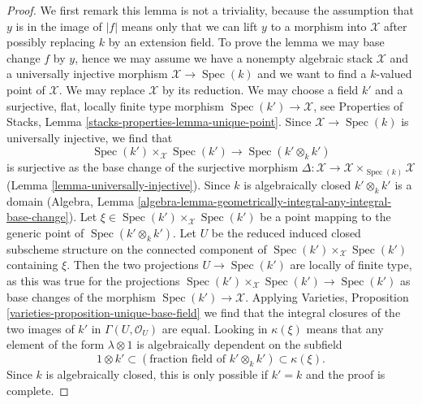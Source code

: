 \documentclass[10pt,a4paper]{amsart}
\theoremstyle{plain}
\theoremstyle{definition}
\theoremstyle{remark}
\numberwithin{equation}{subsection}
\def\Spec{\mathop{\mathrm{Spec}}}
\begin{document}
\begin{proof}
We first remark this lemma is not a triviality, because the assumption that
$y$ is in the image of $|f|$ means only that we can lift
$y$ to a morphism into $\mathcal{X}$ after possibly replacing
$k$ by an extension field. To prove the lemma we may base change
$f$ by $y$, hence we may assume we have a nonempty algebraic stack
$\mathcal{X}$ and a universally injective morphism
$\mathcal{X} \to \Spec(k)$ and we want to find a $k$-valued point
of $\mathcal{X}$. We may replace $\mathcal{X}$ by its reduction.
We may choose a field $k'$ and a surjective, flat, locally finite type morphism
$\Spec(k') \to \mathcal{X}$, see
Properties of Stacks, Lemma \ref{stacks-properties-lemma-unique-point}.
Since $\mathcal{X} \to \Spec(k)$ is universally injective, we find that
$$
\Spec(k') \times_\mathcal{X} \Spec(k') \to \Spec(k' \otimes_k k')
$$
is surjective as the base change of the surjective morphism
$\Delta : \mathcal{X} \to \mathcal{X} \times_{\Spec(k)} \mathcal{X}$
(Lemma \ref{lemma-universally-injective}).
Since $k$ is algebraically closed $k' \otimes_k k'$ is a domain
(Algebra, Lemma
\ref{algebra-lemma-geometrically-integral-any-integral-base-change}).
Let $\xi \in \Spec(k') \times_\mathcal{X} \Spec(k')$
be a point mapping to the generic point of $\Spec(k' \otimes_k k')$.
Let $U$ be the reduced induced closed subscheme structure on
the connected component of $\Spec(k') \times_\mathcal{X} \Spec(k')$
containing $\xi$. Then the two projections $U \to \Spec(k')$
are locally of finite type, as this was true for the projections
$\Spec(k') \times_\mathcal{X} \Spec(k') \to \Spec(k')$
as base changes of the morphism $\Spec(k') \to \mathcal{X}$.
Applying
Varieties, Proposition \ref{varieties-proposition-unique-base-field}
we find that the integral closures of the two images
of $k'$ in $\Gamma(U, \mathcal{O}_U)$ are equal.
Looking in $\kappa(\xi)$ means that any element of the form
$\lambda \otimes 1$ is algebraically dependent on
the subfield
$$
1 \otimes k' \subset 
(\text{fraction field of }k' \otimes_k k') \subset
\kappa(\xi).
$$
Since $k$ is algebraically closed, this is only possible
if $k' = k$ and the proof is complete.
\end{proof}
\end{document}
